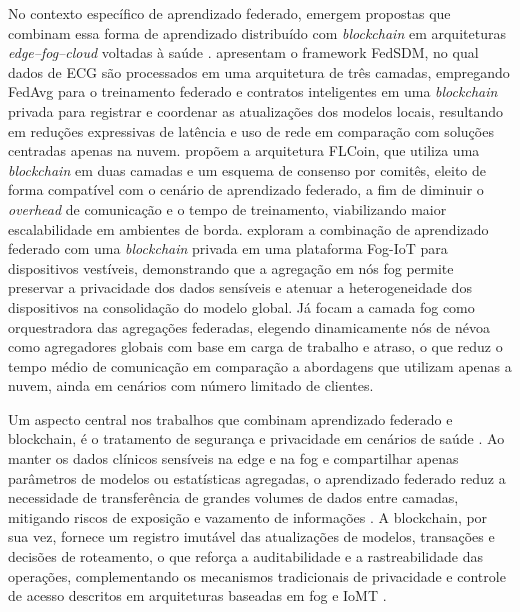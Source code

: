 \documentclass[12pt]{article}
\begin{document}
No contexto específico de aprendizado federado, emergem propostas que combinam essa forma de aprendizado distribuído com \textit{blockchain} em arquiteturas \textit{edge–fog–cloud} voltadas à saúde \cite{rajagopal2025,ren2024,baucas2023,tripathy2024}. \cite{rajagopal2025} apresentam o framework FedSDM, no qual dados de ECG são processados em uma arquitetura de três camadas, empregando FedAvg para o treinamento federado e contratos inteligentes em uma \textit{blockchain} privada para registrar e coordenar as atualizações dos modelos locais, resultando em reduções expressivas de latência e uso de rede em comparação com soluções centradas apenas na nuvem. \cite{ren2024} propõem a arquitetura FLCoin, que utiliza uma \textit{blockchain} em duas camadas e um esquema de consenso por comitês, eleito de forma compatível com o cenário de aprendizado federado, a fim de diminuir o \textit{overhead} de comunicação e o tempo de treinamento, viabilizando maior escalabilidade em ambientes de borda. \cite{baucas2023} exploram a combinação de aprendizado federado com uma \textit{blockchain} privada em uma plataforma Fog-IoT para dispositivos vestíveis, demonstrando que a agregação em nós fog permite preservar a privacidade dos dados sensíveis e atenuar a heterogeneidade dos dispositivos na consolidação do modelo global. Já \cite{tripathy2024} focam a camada fog como orquestradora das agregações federadas, elegendo dinamicamente nós de névoa como agregadores globais com base em carga de trabalho e atraso, o que reduz o tempo médio de comunicação em comparação a abordagens que utilizam apenas a nuvem, ainda em cenários com número limitado de clientes.

Um aspecto central nos trabalhos que combinam aprendizado federado e blockchain, é o tratamento de segurança e privacidade em cenários de saúde \cite{rajagopal2025,baucas2023,ahmad2023}. Ao manter os dados clínicos sensíveis na edge e na fog e compartilhar apenas parâmetros de modelos ou estatísticas agregadas, o aprendizado federado reduz a necessidade de transferência de grandes volumes de dados entre camadas, mitigando riscos de exposição e vazamento de informações \cite{rajagopal2025,tripathy2024,baucas2023}. A blockchain, por sua vez, fornece um registro imutável das atualizações de modelos, transações e decisões de roteamento, o que reforça a auditabilidade e a rastreabilidade das operações, complementando os mecanismos tradicionais de privacidade e controle de acesso descritos em arquiteturas baseadas em fog e IoMT \cite{ahmad2023,kamruzzaman2022,alam2022}.
\end{document}
